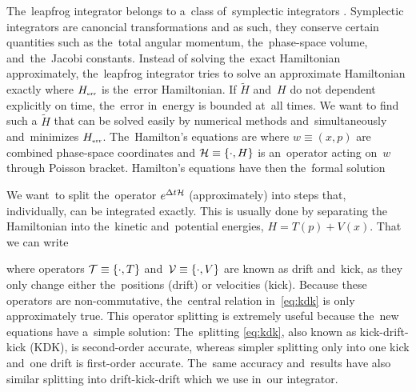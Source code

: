 The~leapfrog integrator belongs to a~class of~symplectic integrators \parencite{2011EPJP..126...55D}. Symplectic integrators are canoncial transformations and as such, they conserve certain quantities such as the~total angular momentum, the~phase-space volume, and~the~Jacobi constants. Instead of solving the~exact Hamiltonian approximately, the~leapfrog integrator tries to solve an approximate Hamiltonian exactly
where \(H_\text{\tiny err}\) is the~error Hamiltonian. If \(\tilde H\) and~\(H\) do not dependent explicitly on time, the~error in~energy is bounded at~all times. We want to find such a \(\tilde H\) that can be solved easily by numerical methods and~simultaneously and~minimizes \(H_\text{\tiny err}\). The~Hamilton's equations are
where \(w\equiv(x,p)\) are combined phase-space coordinates and \(\mathcal{H}\equiv\{\cdot,H\}\) is an~operator acting on~\(w\) through Poisson bracket. Hamilton’s equations have then the~formal solution
\begin{sloppypar}
We want~to split the~operator \(e^{\Delta t\mathcal{H}}\) (approximately) into steps that, individually, can be integrated exactly. This is usually done by separating the Hamiltonian into the~kinetic and~potential energies, \({H=T(p)+V(x)}\). That we can write
\end{sloppypar}
where operators \(\mathcal{T}\equiv\{\cdot,T\}\) and~\(\mathcal{V}\equiv\{\cdot,V\}\) are known as drift and~kick, as they only change either the~positions (drift) or velocities (kick). Because these operators are non-commutative, the~central relation in~\eqref{eq:kdk} is only approximately true. This operator splitting is extremely useful because the~new equations have a~simple solution:
The~splitting \eqref{eq:kdk}, also known as kick-drift-kick (KDK), is second-order accurate, whereas simpler splitting only into one kick and~one drift is first-order accurate. The~same accuracy and~results have also similar splitting into drift-kick-drift which we use in~our integrator.
